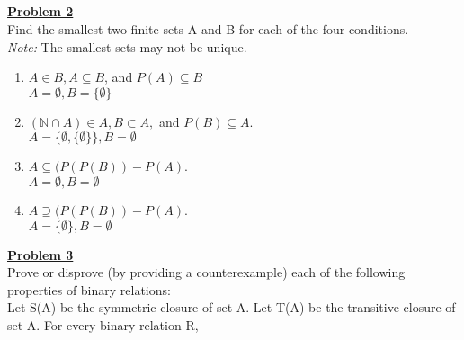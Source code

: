 \documentclass[11pt]{article}
\begin{document}
\ \\\\\\\\\\\\\\\\\\
	\noindent\textbf{\underline{Problem 2}}\\
	Find the smallest two finite sets A and B for each of the four conditions.\\
\textit{Note:} The smallest sets may not be unique.

	\begin{enumerate}
		\item $A \in B, A \subseteq B$, and $P(A) \subseteq B$\\

			$A = \emptyset , B = \{ \emptyset \}$\\
		\item $( \mathbb{N} \cap A ) \in A, B \subset A,$ and $P(B) \subseteq A.$\\

			$A = \{ \emptyset, \{ \emptyset \} \} , B = \emptyset$\\
		\item $A \subseteq (P (P(B)) - P(A)$.\\

			$A = \emptyset, B = \emptyset$\\
		\item $A \supseteq (P (P(B)) - P(A)$.\\

			$A = \{ \emptyset \} , B = \emptyset$
	
	\end{enumerate}

	\noindent\textbf{\underline{Problem 3}}\\
	Prove or disprove (by providing a counterexample) each of the following properties of binary relations:\\
	Let S(A) be the symmetric closure of set A. Let T(A) be the transitive closure of set A. For every binary relation R, 
\end{document}
